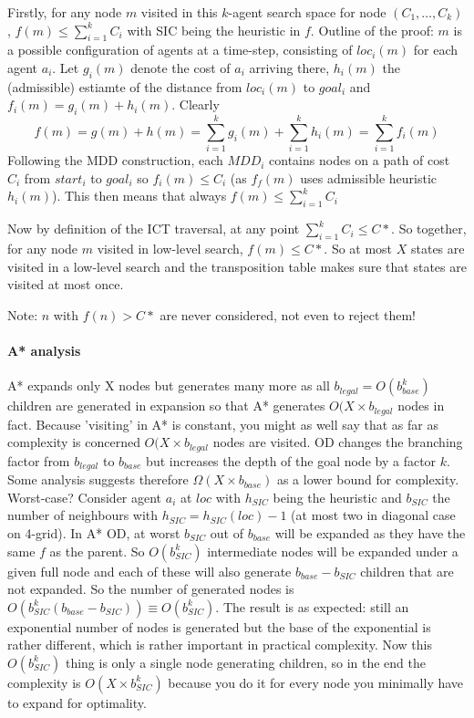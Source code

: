 \documentclass[a4paper,10pt,english]{article}
\begin{document}
	Firstly, for any node $m$ visited in this $k$-agent search space for node $(C_1,\ldots,C_k)$, $f(m) \leq \sum_{i=1}^k C_i$ with SIC being the heuristic in $f$. Outline of the proof: $m$ is a possible configuration of agents at a time-step, consisting of $loc_i(m)$ for each agent $a_i$. Let $g_i(m)$ denote the cost of $a_i$ arriving there, $h_i(m)$ the (admissible) estiamte of the distance from $loc_i(m)$ to $goal_i$ and $f_i(m) = g_i(m) + h_i(m)$. Clearly
	\[f(m) = g(m) + h(m) = \sum_{i=1}^k g_i(m) + \sum_{i=1}^k h_i(m) = \sum_{i=1}^kf_i(m)\]
	Following the MDD construction, each $MDD_i$ contains nodes on a path of cost $C_i$ from $start_i$ to $goal_i$ so $f_i(m) \leq C_i$ (as $f_f(m)$ uses admissible heuristic $h_i(m)$). This then means that always $f(m) \leq \sum_{i=1}^kC_i$
	
	Now by definition of the ICT traversal, at any point $\sum_{i = 1}^k C_i \leq C*$. So together, for any node $m$ visited in low-level search,  $f(m) \leq C*$. So at most $X$ states are visited in a low-level search and the transposition table makes sure that states are visited at most once. 
	
	Note: $n$ with $f(n) > C*$ are never considered, not even to reject them!
	\paragraph{A* analysis}
	A* expands only X nodes but generates many more as all $b_{legal} = O(b_{base}^k)$ children are generated in expansion so that A* generates $O(X \times b_{legal}$ nodes in fact. Because 'visiting' in A* is constant, you might as well say that as far as complexity is concerned $O(X \times b_{legal}$ nodes are visited. OD changes the branching factor from $b_{legal}$ to $b_{base}$ but increases the depth of the goal node by a factor $k$. Some analysis suggests therefore $\Omega(X \times b_{base})$ as a lower bound for complexity. Worst-case? Consider agent $a_i$ at $loc$ with $h_{SIC}$ being the heuristic and $b_{SIC}$ the number of neighbours with $h_{SIC} = h_{SIC}(loc) - 1$ (at most two in diagonal case on 4-grid). In A* OD, at worst $b_{SIC}$ out of $b_{base}$ will be expanded as they have the same $f$ as the parent. So $O(b_{SIC}^k)$ intermediate nodes will be expanded under a given full node and each of these will also generate $b_{base}-b_{SIC}$ children that are not expanded. So the number of generated nodes is $O(b_{SIC}^k(b_{base}-b_{SIC})) \equiv O(b_{SIC}^k)$. The result is as expected: still an exponential number of nodes is generated but the base of the exponential is rather different, which is rather important in practical complexity. Now this $O(b_{SIC}^k)$ thing is only a single node generating children, so in the end the complexity is $O(X\times b_{SIC}^k)$ because you do it for every node you minimally have to expand for optimality.
	
\end{document}
